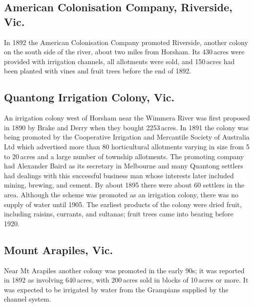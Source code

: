 \subsection*{American Colonisation Company, Riverside, Vic.}

In 1892 the American Colonisation Company promoted Riverside, another
colony on the south side of the river, about two miles from Horsham.
Its 430\,acres were provided with irrigation
channels, all allotments were
sold, and 150\,acres had been planted with vines and fruit trees
before the end of 1892.

\subsection*{Quantong Irrigation Colony, Vic.}

An irrigation colony west of Horsham near the Wimmera River was first
proposed in 1890 by Brake and Derry when they bought 2253\,acres.  In
1891 the colony was being promoted by the Cooperative Irrigation and
Mercantile Society of Australia Ltd  which advertised more than 80
horticultural allotments varying in size from 5 to 20\,acres and a
large number of township allotments.  The promoting company had
Alexander Baird  as its secretary in Melbourne and
many Quantong settlers had dealings with this successful business man
whose interests later included mining, brewing, and cement.  By about
1895 there were about 60 settlers in the area.  Although the scheme
was promoted as an irrigation colony, there was no supply of water
until 1905.  The earliest products of the colony were dried
fruit, including raisins, currants,
and sultanas; fruit trees came into bearing before
1920.

\subsection*{Mount Arapiles, Vic.}

Near Mt Arapiles another colony was promoted in the early 90s; it was
reported in 1892 as involving 640\,acres, with 200\,acres sold in
blocks of 10\,acres or more.  It was expected to be irrigated by water
from the Grampians supplied by the
channel
system.

